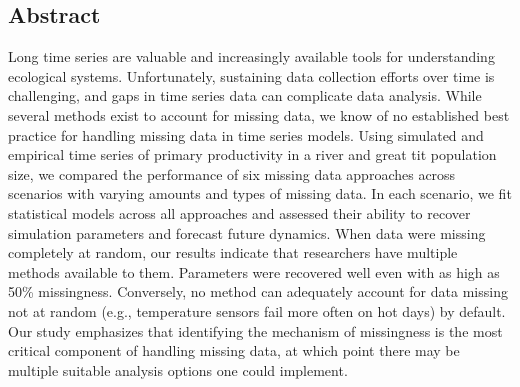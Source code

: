 \documentclass[12pt,english]{article} %
\begin{document}
\begin{linenumbers}
\begin{spacing}{1.9}
\begin{flushleft}


\section*{Abstract} %

Long time series are valuable and increasingly available tools for understanding ecological systems. Unfortunately, sustaining data collection efforts over time is challenging, and gaps in time series data can complicate data analysis. While several methods exist to account for missing data, we know of no established best practice for handling missing data in time series models. Using simulated and empirical time series of primary productivity in a river and great tit population size, we compared the performance of six missing data approaches across scenarios with varying amounts and types of missing data. In each scenario, we fit statistical models across all approaches and assessed their ability to recover simulation parameters and forecast future dynamics. When data were missing completely at random, our results indicate that researchers have multiple methods available to them. Parameters were recovered well even with as high as 50\% missingness. Conversely, no method can adequately account for data missing not at random (e.g., temperature sensors fail more often on hot days) by default. Our study emphasizes that identifying the mechanism of missingness is the most critical component of handling missing data, at which point there may be multiple suitable analysis options one could implement.




\end{flushleft}
\end{spacing}
\end{linenumbers}
\end{document}
